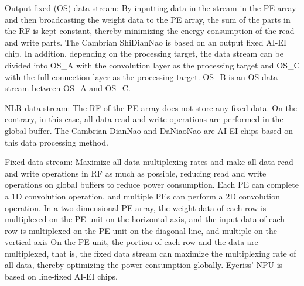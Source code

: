 \documentclass[UTF8,12pt,a4paper]{article}
\begin{document}
Output fixed (OS) data stream: By inputting data in the stream in the PE array
and then broadcasting the weight data to the PE array,
the sum of the parts in the RF is kept constant,
thereby minimizing the energy consumption of the read and write parts.
The Cambrian ShiDianNao is based on an output fixed AI-EI chip.
In addition, depending on the processing target,
the data stream can be divided into OS\_A with the convolution layer as the processing target
and OS\_C with the full connection layer as the processing target.
OS\_B is an OS data stream between OS\_A and OS\_C.

NLR data stream: The RF of the PE array does not store any fixed data.
On the contrary, in this case, all data read and write operations are performed in the global buffer.
The Cambrian DianNao and DaNiaoNao are AI-EI chips based on this data processing method.

Fixed data stream: Maximize all data multiplexing rates and make all data read and write operations in RF as much as possible,
reducing read and write operations on global buffers to reduce power consumption.
Each PE can complete a 1D convolution operation,
and multiple PEs can perform a 2D convolution operation.
In a two-dimensional PE array, the weight data of each row is multiplexed on the PE unit on the horizontal axis,
and the input data of each row is multiplexed on the PE unit on the diagonal line,
and multiple on the vertical axis On the PE unit,
the portion of each row and the data are multiplexed, that is,
the fixed data stream can maximize the multiplexing rate of all data,
thereby optimizing the power consumption globally.
Eyeriss' NPU is based on line-fixed AI-EI chips.

\clearpage

\end{document}

